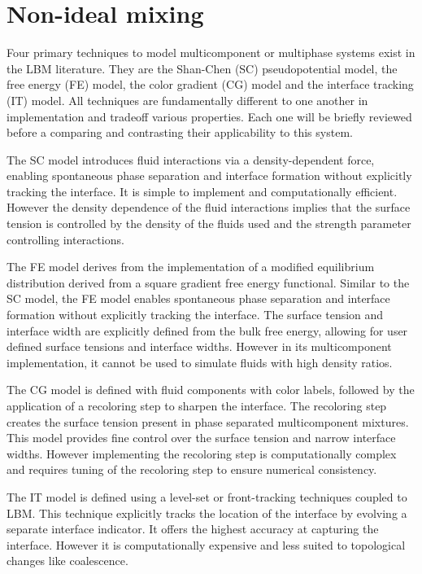 \section{Non-ideal mixing}
\label{section:lbm_non_ideal_mixing}

Four primary techniques to model multicomponent or multiphase systems exist in the LBM literature. They are the Shan-Chen (SC) pseudopotential
model, the free energy (FE) model, the color gradient (CG) model and the interface tracking (IT) model. All techniques are fundamentally different to one
another in implementation and tradeoff various properties. Each one will be briefly reviewed before a comparing and contrasting their applicability
to this system. 

The SC model introduces fluid interactions via a density-dependent force, enabling spontaneous phase separation 
and interface formation without explicitly tracking the interface. It is simple to implement and computationally efficient. However the density
dependence of the fluid interactions implies that the surface tension is controlled by the density of the fluids used and the strength parameter
controlling interactions.

The FE model derives from the implementation of a modified equilibrium distribution derived from a square gradient free energy functional. Similar to the
SC model, the FE model enables spontaneous phase separation and interface formation without explicitly tracking the interface. The surface tension and
interface width are explicitly defined from the bulk free energy, allowing for user defined surface tensions and interface widths. However in its multicomponent
implementation, it cannot be used to simulate fluids with high density ratios.

The CG model is defined with fluid components with color labels, followed by the application of a recoloring step to sharpen the interface. 
\cite{liu_multiphase_2016} The recoloring step creates the surface tension present in phase separated multicomponent mixtures. This model
provides fine control over the surface tension and narrow interface widths. However implementing the recoloring step is computationally complex 
and requires tuning of the recoloring step to ensure numerical consistency.  

The IT model is defined using a level-set or front-tracking techniques coupled to LBM. This technique explicitly tracks the location of the
interface by evolving a separate interface indicator. It offers the highest accuracy at capturing the interface. However it is computationally
expensive and less suited to topological changes like coalescence. 

